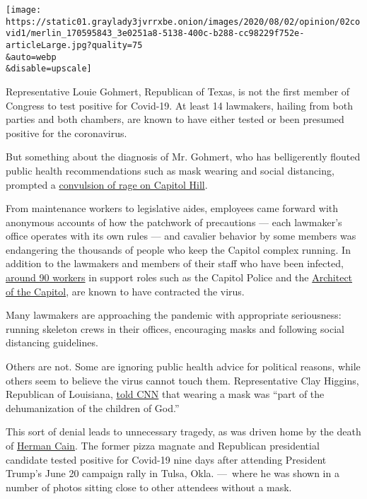 \texttt{[image: https://static01.graylady3jvrrxbe.onion/images/2020/08/02/opinion/02covid1/merlin\_170595843\_3e0251a8-5138-400c-b288-cc98229f752e-articleLarge.jpg?quality=75\\\&auto=webp\\\&disable=upscale]}

Representative Louie Gohmert, Republican of Texas, is not the first
member of Congress to test positive for Covid-19. At least 14 lawmakers,
hailing from both parties and both chambers, are known to have either
tested or been presumed positive for the coronavirus.

But something about the diagnosis of Mr. Gohmert, who has belligerently
flouted public health recommendations such as mask wearing and social
distancing, prompted a
\href{https://www.politico.com/news/2020/07/30/capitol-hill-angry-gohmert-coronavirus-388230}{convulsion
of rage on Capitol Hill}.

From maintenance workers to legislative aides, employees came forward
with anonymous accounts of how the patchwork of precautions --- each
lawmaker's office operates with its own rules --- and cavalier behavior
by some members was endangering the thousands of people who keep the
Capitol complex running. In addition to the lawmakers and members of
their staff who have been infected,
\href{https://www.politico.com/news/2020/07/30/capitol-hill-angry-gohmert-coronavirus-388230}{around
90 workers} in support roles such as the Capitol Police and the
\href{https://www.aoc.gov/about-us/who-we-are}{Architect of the
Capitol}, are known to have contracted the virus.

Many lawmakers are approaching the pandemic with appropriate
seriousness: running skeleton crews in their offices, encouraging masks
and following social distancing guidelines.

Others are not. Some are ignoring public health advice for political
reasons, while others seem to believe the virus cannot touch them.
Representative Clay Higgins, Republican of Louisiana,
\href{https://www.cnn.com/2020/07/29/politics/pelosi-mask-mandate-capitol/index.html}{told
CNN} that wearing a mask was ``part of the dehumanization of the
children of God.''

This sort of denial leads to unnecessary tragedy, as was driven home by
the death of
\href{https://www.nytimes3xbfgragh.onion/2020/07/30/us/politics/herman-cain-dead.html}{Herman
Cain}. The former pizza magnate and Republican presidential candidate
tested positive for Covid-19 nine days after attending President Trump's
June 20 campaign rally in Tulsa, Okla. ---~where he was shown in a
number of photos sitting close to other attendees without a mask.


